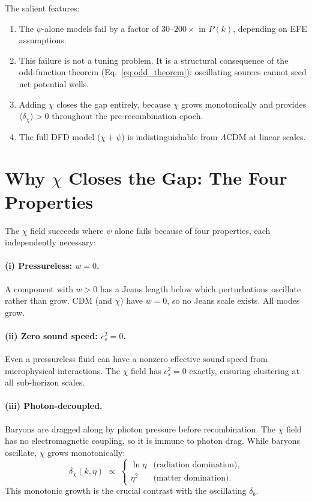 \documentclass[12pt,a4paper]{article}
\newcommand{\LCDM}{\Lambda\mathrm{CDM}}
\begin{document}
The salient features:
\begin{enumerate}
  \item The $\psi$-alone models fail by a factor of $30$--$200\times$
    in $P(k)$, depending on EFE assumptions.
  \item This failure is not a tuning problem. It is a structural
    consequence of the odd-function theorem
    (Eq.~\ref{eq:odd_theorem}): oscillating sources cannot seed net
    potential wells.
  \item Adding $\chi$ closes the gap entirely, because $\chi$ grows
    monotonically and provides $\langle\delta_\chi\rangle > 0$
    throughout the pre-recombination epoch.
  \item The full DFD model ($\chi + \psi$) is indistinguishable from
    $\LCDM$ at linear scales.
\end{enumerate}

\section{Why $\chi$ Closes the Gap: The Four Properties}
\label{sec:why_chi}

The $\chi$ field succeeds where $\psi$ alone fails because of four
properties, each independently necessary:

\paragraph{(i) Pressureless: $w = 0$.}
A component with $w > 0$ has a Jeans length below which perturbations
oscillate rather than grow. CDM (and $\chi$) have $w = 0$, so no Jeans
scale exists. All modes grow.

\paragraph{(ii) Zero sound speed: $c_s^2 = 0$.}
Even a pressureless fluid can have a nonzero effective sound speed from
microphysical interactions. The $\chi$ field has $c_s^2 = 0$ exactly,
ensuring clustering at all sub-horizon scales.

\paragraph{(iii) Photon-decoupled.}
Baryons are dragged along by photon pressure before recombination. The
$\chi$ field has no electromagnetic coupling, so it is immune to photon
drag. While baryons oscillate, $\chi$ grows monotonically:
\begin{equation}
  \delta_\chi(k,\eta) \;\propto\;
  \begin{cases}
    \ln\eta & \text{(radiation domination)}, \\
    \eta^2 & \text{(matter domination)}.
  \end{cases}
\end{equation}
This monotonic growth is the crucial contrast with the oscillating
$\delta_b$.
\end{document}
